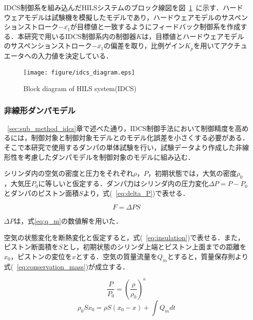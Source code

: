 \documentclass[a4paper,12pt]{article_vdlab_sotsuron}
\begin{document}
IDCS制御系を組み込んだHILSシステムのブロック線図を図~\ref{fig:idcs_diagram}~に示す．ハードウェアモデルは試験機を模擬したモデルであり，ハードウェアモデルのサスペンションストローク$-\bar{x_1}$が目標値と一致するようにフィードバック制御系を作成する．本研究で用いるIDCS制御系内の制御器$K$は，目標値とハードウェアモデルのサスペンションストローク$-\bar{x_1}$の偏差を取り，比例ゲイン$K_p$を用いてアクチュエータへの入力値を決定している．


\vspace*{7mm}
\begin{figure}[htp]
  \begin{center}
    \texttt{[image: figure/idcs\_diagram.eps]}
    \vspace*{3mm}
    \caption{Block diagram of HILS system(IDCS)}
    \label{fig:idcs_diagram}
  \end{center}
\end{figure}
\newpage

\subsubsection{非線形ダンパモデル}
~\ref{sec:sub_method_idcs}章で述べた通り，IDCS制御手法において制御精度を高めるには，制御対象と制御対象モデルとのモデル化誤差を小さくする必要がある．そこで本研究で使用するダンパの単体試験を行い，試験データより作成した非線形性を考慮したダンパモデルを制御対象のモデルに組み込む．

シリンダ内の空気の密度と圧力をそれぞれ$\rho$，$P$，初期状態では，大気の密度$\rho_0$，大気圧$P_0$に等しいと仮定する．ダンパ力はシリンダ内の圧力変化$\Delta P = P-P_0$とダンパのピストン面積$S$より，式(~\ref{eq:delta_P})で表せる．

\begin{equation}
  F = \Delta PS \label{eq:delta_P}
\end{equation}

$\Delta P$は，式\ref{eq:q_m}の数値解を用いた．

空気の状態変化を断熱変化と仮定すると，式(~\ref{eq:insulation})で表せる．また，ピストン断面積を$S$とし，初期状態のシリンダ上端とピストン上面までの距離を$x_0$，ピストンの変位を$x$とする．空気の質量流量を$Q_m$とすると，質量保存則より式(~\ref{eq:conservation_mass})が成立する．

\begin{equation}
  \frac{P}{P_0} = \left(\frac{\rho}{\rho_0} \right)^\kappa \label{eq:insulation}
\end{equation}
\begin{equation}
  \rho_0 S x_0 = \rho S(x_0 - x) + \int Q_m dt \label{eq:conservation_mass}
\end{equation}
\end{document}
